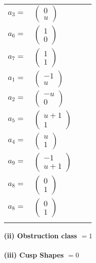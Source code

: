 \documentclass[1p]{elsarticle_modified}
\theoremstyle{definition}
\begin{document}
\begin{tabular}{m{7pt} m{180pt} m{7pt} m{180pt} }
\flushright $a_{3}=$&$\begin{pmatrix}0\\u\end{pmatrix}$ \\
\flushright $a_{6}=$&$\begin{pmatrix}1\\0\end{pmatrix}$ \\
\flushright $a_{7}=$&$\begin{pmatrix}1\\1\end{pmatrix}$ \\
\flushright $a_{1}=$&$\begin{pmatrix}-1\\u\end{pmatrix}$ \\
\flushright $a_{2}=$&$\begin{pmatrix}- u\\0\end{pmatrix}$ \\
\flushright $a_{5}=$&$\begin{pmatrix}u+1\\1\end{pmatrix}$ \\
\flushright $a_{4}=$&$\begin{pmatrix}u\\1\end{pmatrix}$ \\
\flushright $a_{9}=$&$\begin{pmatrix}-1\\u+1\end{pmatrix}$ \\
\flushright $a_{8}=$&$\begin{pmatrix}0\\1\end{pmatrix}$\\ \flushright $a_{8}=$&$\begin{pmatrix}0\\1\end{pmatrix}$\\&\end{tabular}
\flushleft \textbf{(ii) Obstruction class $= 1$}\\~\\
\flushleft \textbf{(iii) Cusp Shapes $= 0$}\\~\\
\end{document}
